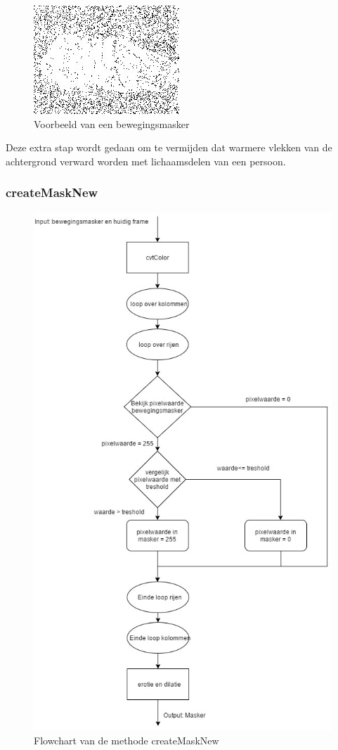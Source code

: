 \begin{figure}[h]
	\includegraphics[scale=0.75]{bewegingsMatrix}
	\caption{Voorbeeld van een bewegingsmasker}
	\label{imgBMa}
\end{figure}
Deze extra stap wordt gedaan om te vermijden dat warmere vlekken van de achtergrond verward worden met lichaamsdelen van een persoon. 

\subsubsection{createMaskNew}
\begin{figure}[hbp]
	\includegraphics[scale=0.45]{FlowChart_createMaskNew}
	\caption{Flowchart van de methode createMaskNew}
	\label{imgFCCMN}
\end{figure}
